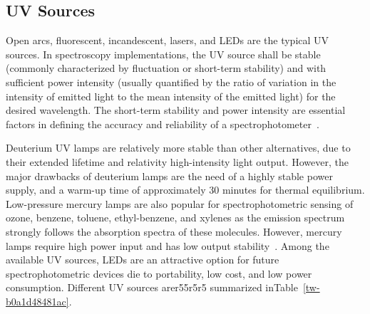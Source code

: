 \documentclass[11pt]{article}
\begin{document}
\subsection{UV Sources}Open arcs, fluorescent, incandescent, lasers, and LEDs are the typical UV sources. In spectroscopy implementations, the UV source shall be stable (commonly characterized by fluctuation or short-term stability) and with sufficient power intensity (usually quantified by the ratio of variation in the intensity of emitted light to the mean intensity of the emitted light) for the desired wavelength. The short-term stability and power intensity are essential factors in defining the accuracy and reliability of a spectrophotometer\unskip~\cite{693772:16434827}.

Deuterium UV lamps are relatively more stable than other alternatives, due to their extended lifetime and relativity high-intensity light output. However, the major drawbacks of deuterium lamps are the need of a highly stable power supply, and a warm-up time of approximately 30 minutes for thermal equilibrium. Low-pressure mercury lamps are also popular for spectrophotometric sensing of ozone, benzene, toluene, ethyl-benzene, and xylenes as the emission spectrum strongly follows the absorption spectra of these molecules. However, mercury lamps require high power input and has low output stability\unskip~\cite{693772:16434827}. Among the available UV sources, LEDs are an attractive option for future spectrophotometric devices die to portability, low cost, and low power consumption. Different UV sources arer55r5r5 summarized inTable~\ref{tw-b0a1d48481ac}.
\end{document}
